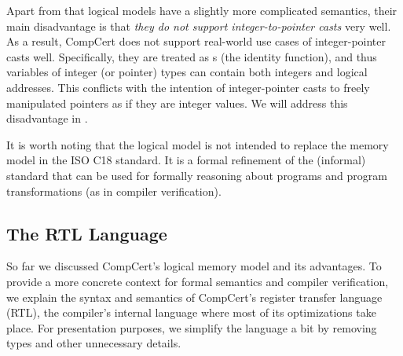 
Apart from that logical models have a slightly more complicated semantics, their main disadvantage
is that \emph{they do not support integer-to-pointer casts} very well.  As a result, CompCert does
not support real-world use cases of integer-pointer casts well.
Specifically, they are treated as s (\ie the identity function), and thus variables of
integer (or pointer) types can contain both integers and logical addresses.  This conflicts with the
intention of integer-pointer casts to freely manipulated pointers as if they are integer values.  We
will address this disadvantage in .


It is worth noting that the logical model is not intended to replace the memory model in the ISO C18
standard.  It is a formal refinement of the (informal) standard that can be used for formally
reasoning about programs and program transformations (as in compiler verification).


\subsection{The RTL Language}
\label{sec:background:rtl}

So far we discussed CompCert's logical memory model and its advantages.  To provide a more concrete
context for formal semantics and compiler verification, we explain the syntax and semantics of
CompCert's register transfer language (RTL), the compiler's internal language where most of its
optimizations take place.  For presentation purposes, we simplify the language a bit by removing
types and other unnecessary details.



